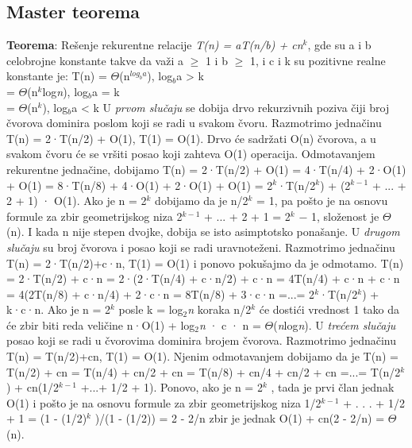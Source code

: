 \documentclass{article}
\begin{document}
\subsection{Master teorema}
\textbf{Teorema}: Rešenje rekurentne relacije \textit{T(n) = aT(n/b) + cn$^k$}, gde su a i b
celobrojne konstante takve da važi a $\geq$ 1 i b $\geq$ 1, i c i k su pozitivne realne konstante je:
 T(n) = 
   $\Theta$(n$^{log_ba}$),  log$_b$a > k \\
  \hspace*{3cm}= $\Theta$(n$^k$log\textit{n}),  log$_b$a = k \\
  \hspace*{3cm}= $\Theta$(n$^k$),  log$_b$a < k 
\newpage U \textit{prvom slučaju} se dobija drvo rekurzivnih poziva čiji broj čvorova dominira poslom koji se radi u svakom čvoru. Razmotrimo jednačinu T(n) = 2·T(n/2) + O(1), T(1) = O(1). Drvo će sadržati O(n) čvorova, a u svakom čvoru će se vršiti posao koji zahteva O(1) operacija. Odmotavanjem rekurentne jednačine, dobijamo T(n) = 2·T(n/2) + O(1) = 4·T(n/4) + 2·O(1) + O(1) = 8·T(n/8) + 4·O(1) + 2·O(1) + O(1) = 2$^k$·T(n/2$^k$) + (2$^{k-1}$ + ... + 2 + 1) · O(1). Ako je n = 2$^k$ dobijamo da je n/2$^k$ = 1, pa pošto je na osnovu formule za zbir
geometrijskog niza 2$^{k-1}$ + ... + 2 + 1 = 2$^k$ − 1, složenost je $\Theta$(n). I kada n
nije stepen dvojke, dobija se isto asimptotsko ponašanje.
\newline \hspace*{0.6cm}U \textit{drugom slučaju} su broj čvorova i posao koji se radi uravnoteženi. Razmotrimo jednačinu T(n) = 2·T(n/2)+c·n, T(1) = O(1) i ponovo pokušajmo da je odmotamo. T(n) = 2·T(n/2) + c·n = 2·(2·T(n/4) + c·n/2) + c·n =
4T(n/4) + c·n + c·n = 4(2T(n/8) + c·n/4) + 2·c·n = 8T(n/8) + 3·c·n =...= 2$^k$·T(n/2$^k$) + k·c·n. Ako je n = 2$^k$ posle k = log$_2$\textit{n} koraka n/2$^k$ će dostići
vrednost 1 tako da će zbir biti reda veličine n·O(1) + log$_2$\textit{n} · c · n = $\Theta$(\textit{n}log\textit{n}).
\newline \hspace*{0.6cm}U \textit{trećem slučaju} posao koji se radi u čvorovima dominira brojem čvorova. Razmotrimo jednačinu T(n) = T(n/2)+cn, T(1) = O(1). Njenim odmotavanjem
dobijamo da je T(n) = T(n/2) + cn = T(n/4) + cn/2 + cn = T(n/8) + cn/4 + cn/2 + cn =...= T(n/2$^k$) + cn(1/2$^{k-1}$ +...+ 1/2 + 1). Ponovo, ako je n = 2$^k$
,
tada je prvi član jednak O(1) i pošto je na osnovu formule za zbir geometrijskog
niza 1/2$^{k-1}$ + . . . + 1/2 + 1 = (1 - (1/2)$^k$
)/(1 - (1/2)) = 2 - 2/n zbir je jednak
O(1) + cn(2 - 2/n) = $\Theta$(n).
\end{document}
